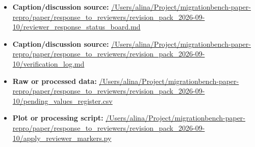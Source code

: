 \begin{itemize}[leftmargin=1.4em,noitemsep]
\item \textbf{Caption/discussion source:} \url{/Users/alina/Project/migrationbench-paper-repro/paper/response_to_reviewers/revision_pack_2026-09-10/reviewer_response_status_board.md}
\item \textbf{Caption/discussion source:} \url{/Users/alina/Project/migrationbench-paper-repro/paper/response_to_reviewers/revision_pack_2026-09-10/verification_log.md}
\item \textbf{Raw or processed data:} \url{/Users/alina/Project/migrationbench-paper-repro/paper/response_to_reviewers/revision_pack_2026-09-10/pending_values_register.csv}
\item \textbf{Plot or processing script:} \url{/Users/alina/Project/migrationbench-paper-repro/paper/response_to_reviewers/revision_pack_2026-09-10/apply_reviewer_markers.py}
\end{itemize}

